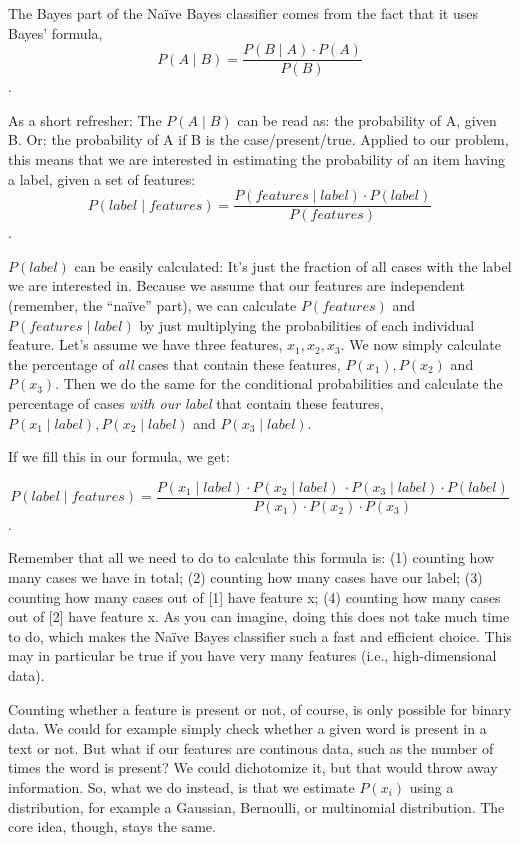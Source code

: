 The Bayes part of the Na\"ive Bayes classifier comes from the fact that it uses Bayes' formula, $$ P(A \mid B) = \frac{P(B \mid A) \cdot P(A)}{P(B)} $$.

As a short refresher: The $P(A \mid B)$ can be read as: the probability of A, given B. Or: the probability of A if B is the case/present/true.
Applied to our problem, this means that we are interested in estimating the probability of an item having a label, given a set of features:
$$ P(label \mid features) = \frac{P(features \mid label) \cdot P(label)}{P(features)} $$.

$P(label)$ can be easily calculated: It's just the fraction of all cases with the label we are interested in.
Because we assume that our features are independent (remember, the ``na\"ive'' part), we can calculate $P(features)$ and $P(features\mid label)$ by just multiplying the probabilities of each individual feature.
Let's assume we have three features, $x_1, x_2, x_3$.
We now simply calculate the percentage  of \emph{all} cases that contain these features, $P(x_1), P(x_2)$ and $P(x_3)$.
Then we do the same for the conditional probabilities and calculate  the percentage  of  cases \emph{with our label} that contain these features, $P(x_1\mid label), P(x_2\mid label)$ and $P(x_3\mid label)$.

If we fill this in our formula, we get:


$$ P(label \mid features) = \frac{P(x_1 \mid label) \cdot P(x_2 \mid label)\ \cdot P(x_3 \mid label) \cdot P(label)}{P(x_1) \cdot P(x_2) \cdot P(x_3)}$$.

Remember that all we need to do to calculate this formula is: (1) counting how many cases we have in total; (2) counting how many cases have our label; (3) counting how many cases out of [1] have feature x; (4) counting how many cases out of [2] have feature x.
As you can imagine, doing this does not take much time to do, which makes the Na\"ive Bayes classifier such a fast and efficient choice.
This may in particular be true if you have very many features (i.e., high-dimensional
data).

Counting whether a feature is present or not, of course, is only possible for binary data. We could for example simply check whether a given word is present in a text or not.
But what if our features are continous data, such as the number of times the word is present?
We could dichotomize it, but that would throw away information.
So, what we do instead, is that we estimate $P(x_i)$ using a distribution, for example a Gaussian, Bernoulli, or multinomial distribution. The core idea, though, stays the same.

